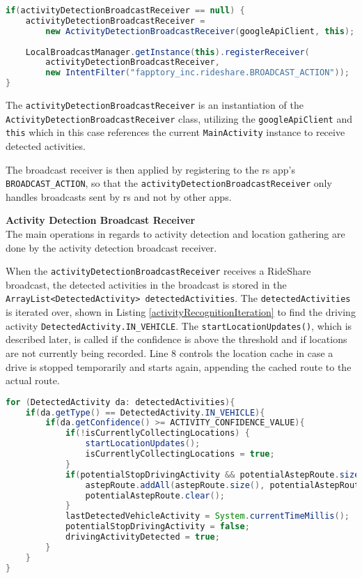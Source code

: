 \begin{lstlisting}[language=Java, label=activityRecognitionInstantiation, caption=Initialization of activity recognition.]
if(activityDetectionBroadcastReceiver == null) {
	activityDetectionBroadcastReceiver = 
		new ActivityDetectionBroadcastReceiver(googleApiClient, this);
		
	LocalBroadcastManager.getInstance(this).registerReceiver(
		activityDetectionBroadcastReceiver, 
		new IntentFilter("fapptory_inc.rideshare.BROADCAST_ACTION"));
}
\end{lstlisting}

The \texttt{activityDetectionBroadcastReceiver} is an instantiation of the\\ \texttt{ActivityDetectionBroadcastReceiver} class, utilizing the \texttt{googleApiClient} and \texttt{this} which in this case references the current \texttt{MainActivity} instance to receive detected activities.

The broadcast receiver is then applied by registering to the \gls{rs} app's\\ \texttt{BROADCAST\_ACTION}, so that the \texttt{activityDetectionBroadcastReceiver} only handles broadcasts sent by \gls{rs} and not by other apps.


\textbf{Activity Detection Broadcast Receiver}\\
The main operations in regards to activity detection and location gathering are done by the activity detection broadcast receiver.

When the \texttt{activityDetectionBroadcastReceiver} receives a RideShare broadcast, the detected activities in the broadcast is stored in the \texttt{ArrayList<DetectedActivity> detectedActivities}.
The \texttt{detectedActivities} is iterated over, shown in Listing \ref{activityRecognitionIteration} to find the driving activity \texttt{DetectedActivity.IN\_VEHICLE}.
The \texttt{startLocationUpdates()}, which is described later, is called if the confidence is above the threshold and if locations are not currently being recorded.
Line 8 controls the location cache in case a drive is stopped temporarily and starts again, appending the cached route to the actual route.

\begin{lstlisting}[language=Java, label=activityRecognitionIteration, caption=Iteration over received list of activity recognition.]
for (DetectedActivity da: detectedActivities){
	if(da.getType() == DetectedActivity.IN_VEHICLE){
		if(da.getConfidence() >= ACTIVITY_CONFIDENCE_VALUE){
			if(!isCurrentlyCollectingLocations) {
				startLocationUpdates();
				isCurrentlyCollectingLocations = true;
			}
			if(potentialStopDrivingActivity && potentialAstepRoute.size() > 0){
				astepRoute.addAll(astepRoute.size(), potentialAstepRoute);
				potentialAstepRoute.clear();
			}
			lastDetectedVehicleActivity = System.currentTimeMillis();
			potentialStopDrivingActivity = false;
			drivingActivityDetected = true;
		}
	}
}
\end{lstlisting}


